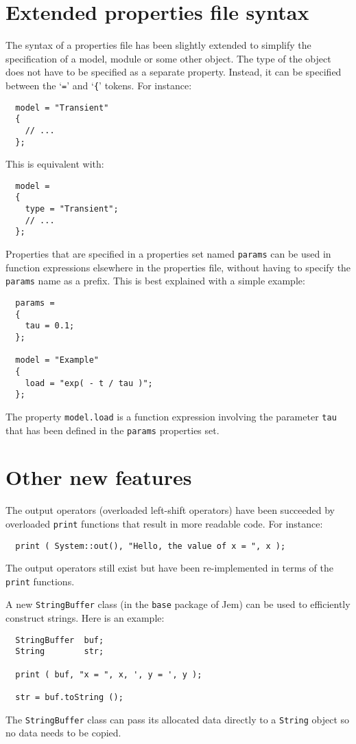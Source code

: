 \documentclass[a4paper]{article}
\newcommand{\Code}[1]{\texttt{#1}}
\begin{document}
\section{Extended properties file syntax}

The syntax of a properties file has been slightly extended to simplify
the specification of a model, module or some other object. The type of
the object does not have to be specified as a separate property. Instead,
it can be specified between the `\Code{=}' and `\Code{\{}' tokens. For
instance:
\begin{lstlisting}
  model = "Transient"
  {
    // ...
  };
\end{lstlisting}
This is equivalent with:
\begin{lstlisting}
  model =
  {
    type = "Transient";
    // ...
  };
\end{lstlisting}

Properties that are specified in a properties set named \Code{params} can
be used in function expressions elsewhere in the properties file, without
having to specify the \Code{params} name as a prefix. This is best
explained with a simple example:
\begin{lstlisting}
  params =
  {
    tau = 0.1;
  };

  model = "Example"
  {
    load = "exp( - t / tau )";
  };
\end{lstlisting}
The property \Code{model.load} is a function expression involving the
parameter \Code{tau} that has been defined in the \Code{params}
properties set.


\section{Other new features}

The output operators (overloaded left-shift operators) have been
succeeded by overloaded \Code{print} functions that result in more
readable code. For instance:
\begin{lstlisting}
  print ( System::out(), "Hello, the value of x = ", x );
\end{lstlisting}
The output operators still exist but have been re-implemented in terms of
the \Code{print} functions.

A new \Code{StringBuffer} class (in the \Code{base} package of Jem) can
be used to efficiently construct strings. Here is an example:
\begin{lstlisting}
  StringBuffer  buf;
  String        str;

  print ( buf, "x = ", x, ', y = ', y );

  str = buf.toString ();
\end{lstlisting}
The \Code{StringBuffer} class can pass its allocated data directly to a
\Code{String} object so no data needs to be copied.
\end{document}
